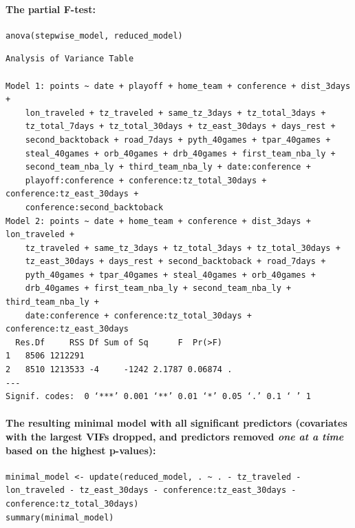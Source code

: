 \documentclass[
    12pt,
    a4paper,
    titlepage,  %
    abstract,  %
    headings=standardclasses,  %
    bibliography=totocnumbered  %
]{scrartcl}
\begin{document}
\paragraph{The partial F-test:}

\begin{verbatim}
anova(stepwise_model, reduced_model)
\end{verbatim}

\begin{Verbatim}[fontsize=\small]
Analysis of Variance Table

Model 1: points ~ date + playoff + home_team + conference + dist_3days + 
    lon_traveled + tz_traveled + same_tz_3days + tz_total_3days + 
    tz_total_7days + tz_total_30days + tz_east_30days + days_rest + 
    second_backtoback + road_7days + pyth_40games + tpar_40games + 
    steal_40games + orb_40games + drb_40games + first_team_nba_ly + 
    second_team_nba_ly + third_team_nba_ly + date:conference + 
    playoff:conference + conference:tz_total_30days + conference:tz_east_30days +
    conference:second_backtoback
Model 2: points ~ date + home_team + conference + dist_3days + lon_traveled + 
    tz_traveled + same_tz_3days + tz_total_3days + tz_total_30days + 
    tz_east_30days + days_rest + second_backtoback + road_7days + 
    pyth_40games + tpar_40games + steal_40games + orb_40games + 
    drb_40games + first_team_nba_ly + second_team_nba_ly + third_team_nba_ly + 
    date:conference + conference:tz_total_30days + conference:tz_east_30days
  Res.Df     RSS Df Sum of Sq      F  Pr(>F)  
1   8506 1212291                              
2   8510 1213533 -4     -1242 2.1787 0.06874 .
---
Signif. codes:  0 ‘***’ 0.001 ‘**’ 0.01 ‘*’ 0.05 ‘.’ 0.1 ‘ ’ 1
\end{Verbatim}

\paragraph{The resulting minimal model with all significant predictors (covariates with the largest VIFs dropped, and predictors removed \emph{one at a time} based on the highest p-values):}

\begin{verbatim}
minimal_model <- update(reduced_model, . ~ . - tz_traveled - lon_traveled - tz_east_30days - conference:tz_east_30days - conference:tz_total_30days)
summary(minimal_model)
\end{verbatim}
\end{document}

